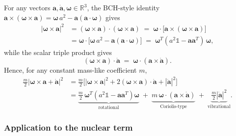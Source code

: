 For any vectors $\mathbf{a},\dot{\mathbf{a}},\boldsymbol{\omega}\in\mathbb{R}^3$, the BCH-style identity $\mathbf{a}\!\times\!(\boldsymbol{\omega}\!\times\!\mathbf{a})=\boldsymbol{\omega}\,a^2-\mathbf{a}(\mathbf{a}\!\cdot\!\boldsymbol{\omega})$ gives
\begin{align}
|\boldsymbol{\omega}\!\times\!\mathbf{a}|^{2} 
&= (\boldsymbol{\omega}\!\times\!\mathbf{a})\!\cdot\!(\boldsymbol{\omega}\!\times\!\mathbf{a})
\;=\; \boldsymbol{\omega}\!\cdot\!\bigl[\mathbf{a}\!\times\!(\boldsymbol{\omega}\!\times\!\mathbf{a})\bigr] \nonumber\\
&= \boldsymbol{\omega}\!\cdot\!\bigl[\boldsymbol{\omega}\,a^{2}-\mathbf{a}(\mathbf{a}\!\cdot\!\boldsymbol{\omega})\bigr]
\;=\; \boldsymbol{\omega}^{T}(a^{2}\mathbb{1}-\mathbf{a}\mathbf{a}^{T})\,\boldsymbol{\omega}, \tag{3.9a}
\end{align}
while the scalar triple product gives
\begin{equation}
(\boldsymbol{\omega}\!\times\!\mathbf{a})\!\cdot\!\dot{\mathbf{a}}
\;=\; \boldsymbol{\omega}\!\cdot\!(\mathbf{a}\!\times\!\dot{\mathbf{a}}). \tag{3.9b}
\end{equation}
Hence, for any constant mass-like coefficient $m$,
\begin{align}
\tfrac{m}{2}\bigl|\boldsymbol{\omega}\!\times\!\mathbf{a} + \dot{\mathbf{a}}\bigr|^{2}
&= \tfrac{m}{2}\bigl[|\boldsymbol{\omega}\!\times\!\mathbf{a}|^{2} + 2(\boldsymbol{\omega}\!\times\!\mathbf{a})\!\cdot\!\dot{\mathbf{a}} + |\dot{\mathbf{a}}|^{2}\bigr] \nonumber\\
&= \underbrace{\tfrac{m}{2}\,\boldsymbol{\omega}^{T}(a^{2}\mathbb{1}-\mathbf{a}\mathbf{a}^{T})\boldsymbol{\omega}}_{\text{rotational}} \;+\; \underbrace{m\,\boldsymbol{\omega}\!\cdot\!(\mathbf{a}\!\times\!\dot{\mathbf{a}})}_{\text{Coriolis-type}} \;+\; \underbrace{\tfrac{m}{2}|\dot{\mathbf{a}}|^{2}}_{\text{vibrational}}. \tag{3.9c}
\end{align}

\subsubsection{Application to the nuclear term}

